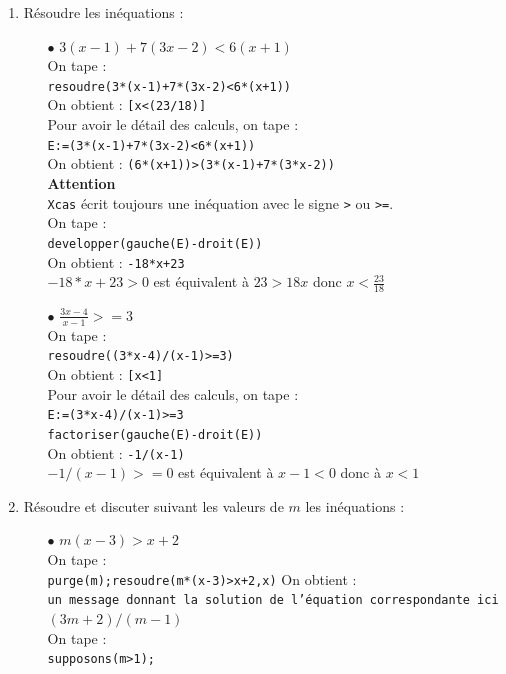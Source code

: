 \documentclass[a4paper,11pt]{book}
\begin{document}
\begin{enumerate}
\item R\'esoudre les in\'equations :
\begin{itemize}
\item[$\bullet$] $3(x-1)+7(3x-2)<6(x+1)$\\
On tape :\\
{\tt  resoudre(3*(x-1)+7*(3x-2)<6*(x+1))}\\
On obtient : {\tt [x<(23/18)]}\\
Pour avoir le d\'etail des calculs, on tape :\\
{\tt E:=(3*(x-1)+7*(3x-2)<6*(x+1))}\\
On obtient : {\tt (6*(x+1))>(3*(x-1)+7*(3*x-2))}\\ 
{\bf Attention}\\
{\tt Xcas} \'ecrit toujours une in\'equation avec le signe {\tt >} ou {\tt >=}.\\
On tape :\\
{\tt developper(gauche(E)-droit(E))}\\
On obtient : {\tt -18*x+23}\\
$-18*x+23>0$ est \'equivalent \`a $23>18x$ donc $x<\frac{23}{18}$
\item[$\bullet$] $\displaystyle \frac{3x-4}{x-1}>=3$\\
On tape :\\
{\tt resoudre((3*x-4)/(x-1)>=3)}\\
On obtient : {\tt [x<1]}\\
Pour avoir le d\'etail des calculs, on tape :\\
{\tt E:=(3*x-4)/(x-1)>=3}\\
{\tt factoriser(gauche(E)-droit(E))}\\
On obtient : {\tt -1/(x-1)}\\
$-1/(x-1)>=0$ est \'equivalent \`a $x-1<0$ donc \`a $x<1$
\end{itemize}
\item R\'esoudre et discuter suivant les valeurs de $m$ les in\'equations :
\begin{itemize}
\item[$\bullet$] $m(x-3)>x+2$\\
On tape :\\
{\tt purge(m);resoudre(m*(x-3)>x+2,x)} 
On obtient :\\
{\tt  un message donnant la solution de l'\'equation correspondante ici 
$(3m+2)/(m-1)$}\\
On tape :\\
{\tt supposons(m>1);}\\

\end{itemize}
\end{enumerate}
\end{document}
